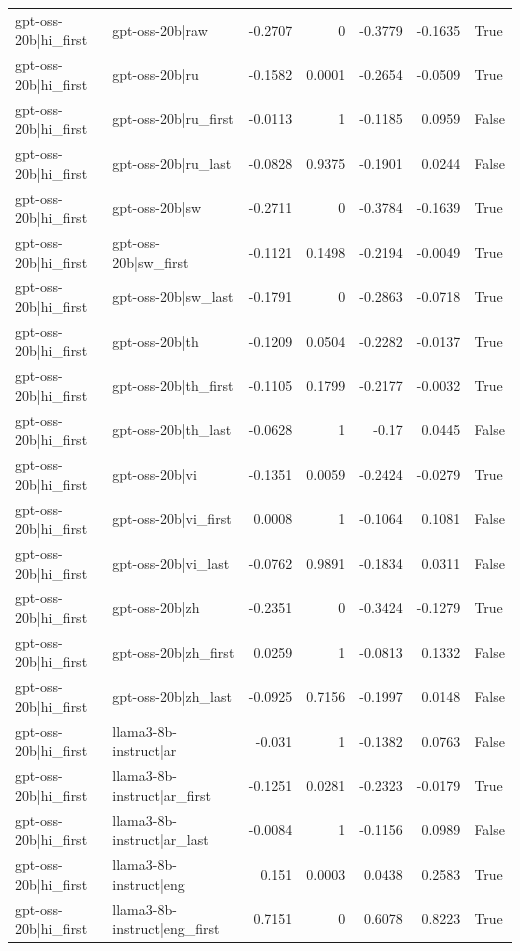 \begin{table}
\begin{tabular}{l l r r r r l}
gpt-oss-20b|hi_first & gpt-oss-20b|raw & -0.2707 & 0 & -0.3779 & -0.1635 & True \\
gpt-oss-20b|hi_first & gpt-oss-20b|ru & -0.1582 & 0.0001 & -0.2654 & -0.0509 & True \\
gpt-oss-20b|hi_first & gpt-oss-20b|ru_first & -0.0113 & 1 & -0.1185 & 0.0959 & False \\
gpt-oss-20b|hi_first & gpt-oss-20b|ru_last & -0.0828 & 0.9375 & -0.1901 & 0.0244 & False \\
gpt-oss-20b|hi_first & gpt-oss-20b|sw & -0.2711 & 0 & -0.3784 & -0.1639 & True \\
gpt-oss-20b|hi_first & gpt-oss-20b|sw_first & -0.1121 & 0.1498 & -0.2194 & -0.0049 & True \\
gpt-oss-20b|hi_first & gpt-oss-20b|sw_last & -0.1791 & 0 & -0.2863 & -0.0718 & True \\
gpt-oss-20b|hi_first & gpt-oss-20b|th & -0.1209 & 0.0504 & -0.2282 & -0.0137 & True \\
gpt-oss-20b|hi_first & gpt-oss-20b|th_first & -0.1105 & 0.1799 & -0.2177 & -0.0032 & True \\
gpt-oss-20b|hi_first & gpt-oss-20b|th_last & -0.0628 & 1 & -0.17 & 0.0445 & False \\
gpt-oss-20b|hi_first & gpt-oss-20b|vi & -0.1351 & 0.0059 & -0.2424 & -0.0279 & True \\
gpt-oss-20b|hi_first & gpt-oss-20b|vi_first & 0.0008 & 1 & -0.1064 & 0.1081 & False \\
gpt-oss-20b|hi_first & gpt-oss-20b|vi_last & -0.0762 & 0.9891 & -0.1834 & 0.0311 & False \\
gpt-oss-20b|hi_first & gpt-oss-20b|zh & -0.2351 & 0 & -0.3424 & -0.1279 & True \\
gpt-oss-20b|hi_first & gpt-oss-20b|zh_first & 0.0259 & 1 & -0.0813 & 0.1332 & False \\
gpt-oss-20b|hi_first & gpt-oss-20b|zh_last & -0.0925 & 0.7156 & -0.1997 & 0.0148 & False \\
gpt-oss-20b|hi_first & llama3-8b-instruct|ar & -0.031 & 1 & -0.1382 & 0.0763 & False \\
gpt-oss-20b|hi_first & llama3-8b-instruct|ar_first & -0.1251 & 0.0281 & -0.2323 & -0.0179 & True \\
gpt-oss-20b|hi_first & llama3-8b-instruct|ar_last & -0.0084 & 1 & -0.1156 & 0.0989 & False \\
gpt-oss-20b|hi_first & llama3-8b-instruct|eng & 0.151 & 0.0003 & 0.0438 & 0.2583 & True \\
gpt-oss-20b|hi_first & llama3-8b-instruct|eng_first & 0.7151 & 0 & 0.6078 & 0.8223 & True \\

\end{tabular}
\end{table}
